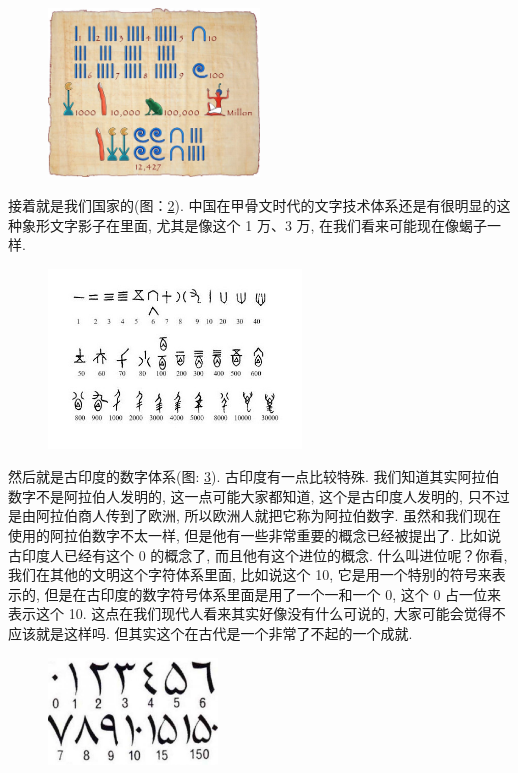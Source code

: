 \begin{figure}[ht]
  \centering\includegraphics[width=0.5\textwidth]{asset/191cd6bc-63e3-4090-af11-bf3e7de6f4db.png}
  \caption{}
  \label{fig:img2_6}
\end{figure}

接着就是我们国家的(图：\ref{fig:img2_7}). 中国在甲骨文时代的文字技术体系还是有很明显的这种象形文字影子在里面, 尤其是像这个 1 万、3 万, 在我们看来可能现在像蝎子一样. 

\begin{figure}[ht]
  \centering\includegraphics[width=0.6\textwidth]{asset/56174953-293d-47aa-893c-52ab80acacd9.png}
  \caption{}
  \label{fig:img2_7}
\end{figure}

然后就是古印度的数字体系(图: \ref{fig:img2_8}). 古印度有一点比较特殊. 我们知道其实阿拉伯数字不是阿拉伯人发明的, 这一点可能大家都知道, 这个是古印度人发明的, 只不过是由阿拉伯商人传到了欧洲, 所以欧洲人就把它称为阿拉伯数字. 虽然和我们现在使用的阿拉伯数字不太一样, 但是他有一些非常重要的概念已经被提出了. 比如说古印度人已经有这个 0 的概念了, 而且他有这个进位的概念. 什么叫进位呢？你看, 我们在其他的文明这个字符体系里面, 比如说这个 10, 它是用一个特别的符号来表示的, 但是在古印度的数字符号体系里面是用了一个一和一个 0, 这个 0 占一位来表示这个 10. 这点在我们现代人看来其实好像没有什么可说的, 大家可能会觉得不应该就是这样吗. 但其实这个在古代是一个非常了不起的一个成就. 

\begin{figure}[ht]
  \centering\includegraphics[width=0.4\textwidth]{asset/02cf4930-6fd5-40ab-b755-155d4bcf1fa1.png}
  \caption{}
  \label{fig:img2_8}
\end{figure}

